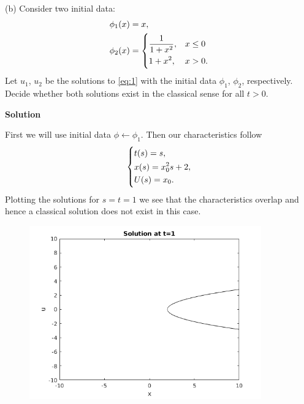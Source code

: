\documentclass{article}
\begin{document}
\vspace{5mm}

(b) Consider two initial data:
%
\begin{align*}
    \phi_1(x) &= x, \\
    \phi_2(x) &=
        \begin{dcases}
            \frac{1}{1 + x^2}, & x \leq 0 \\
            1 + x^2, & x > 0.
        \end{dcases}
\end{align*}
%
Let $u_1$, $u_2$ be the solutions to \eqref{eq:1} with the initial data
$\phi_1$, $\phi_2$, respectively. Decide whether both solutions exist in
the classical sense for all $t > 0$.

\textbf{Solution}

First we will use initial data $\phi \gets \phi_1$. Then our
characteristics follow
%
\begin{equation*}
    \begin{dcases}
        t(s) = s, \\
        x(s) = x_0^2 s + 2, \\
        U(s) = x_0
        .
    \end{dcases}
\end{equation*}
%
Plotting the solutions for $s = t = 1$ we see that the characteristics
overlap and hence a classical solution does not exist in this case.

\begin{figure}[H]
    \centering
    \includegraphics[width=10cm]{q1b1}
\end{figure}
\end{document}
